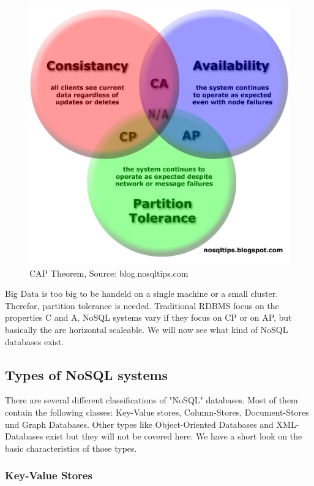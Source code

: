 \documentclass{acm_proc_article-sp}
\begin{document}
\begin{figure}[hbtp]
	\centering
	\includegraphics[scale=0.2]{CAP_Diagram_dist-copy.jpg}
	\caption{CAP Theorem, Source: blog.nosqltips.com}
\end{figure}

Big Data is too big to be handeld on a single machine or a small cluster. Therefor, partition tolerance is needed. Traditional RDBMS focus on the properties C and A, NoSQL systems vary if they focus on CP or on AP, but basically the are horizontal scaleable. We will now see what kind of NoSQL databases exist.

\subsection{Types of NoSQL systems}

There are several different classifications of "NoSQL" databases. Most of them contain the following classes: Key-Value stores, Column-Stores, Document-Stores und Graph Databases. Other types like Object-Oriented Databases and XML-Databases exist but they will not be covered here. We have a short look on the basic characteristics of those types.

\subsubsection{Key-Value Stores}
\end{document}
